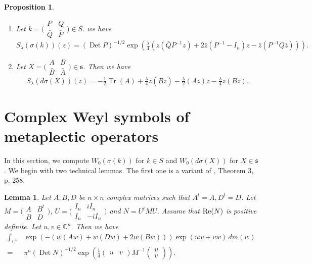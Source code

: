 \documentclass[12pt]{amsart}
\numberwithin{equation}{section}
\newtheorem{lemma}[theorem]{Lemma}
\newtheorem{proposition}[theorem]{Proposition}
\DeclareMathOperator{\Det}{Det} \DeclareMathOperator{\Tr}{Tr}
\begin{document}
\begin{proposition} \label{propSsigma} \begin{enumerate} \item Let $k=\bigl(\begin{smallmatrix} P&Q\\
{\bar Q}&{\bar P} \end{smallmatrix}\bigr)\in S$. we have 
\begin{equation*}S_{\lambda}(\sigma(k))(z)=(\Det P)^{-1/2}\exp \left(\tfrac{\lambda}{4}\left(
z({\bar Q}P^{-1}z)+2{\bar z}(P^{-1}-I_n)z-{\bar z}(P^{-1}Q{\bar z})\right)\right).
\end{equation*}
\item  Let $X=\bigl(\begin{smallmatrix} A&B\\
{\bar B}&{\bar A} \end{smallmatrix}\bigr)\in {\mathfrak s}$. Then we have
\begin{equation*}S_{\lambda}(d\sigma (X))(z)=-\tfrac{1}{2}\Tr(A)+\tfrac{\lambda}{4}z({\bar B}z)
-\tfrac{\lambda}{2}(Az){\bar z}-\tfrac{\lambda}{4}{\bar z}(B{\bar z}).\end{equation*}
\end{enumerate}
\end{proposition}

\section{Complex Weyl symbols of metaplectic operators} \label{sec:7}
In this section, we compute $W_0(\sigma(k))$ for $k\in S$ and $W_0(d\sigma(X))$ for
$X\in {\mathfrak s}$. We begin with two technical lemmas. The first one is a variant of \cite{Fo}, Theorem 3, p. 258.

\begin{lemma} \label{lemgauss} Let $A,B, D$ be $n\times n$ complex matrices such that
$A^t=A, D^t=D$. Let $M=\bigl(\begin{smallmatrix} A&B^t\\
B&D \end{smallmatrix}\bigr)$, $U=\bigl(\begin{smallmatrix} I_n&iI_n\\
I_n&-iI_n \end{smallmatrix}\bigr)$ and $N=U^tMU$. Assume that $\operatorname{Re} (N)$ is positive definite. Let $u,v \in {\mathbb C}^n$. Then we have 
\begin{align*}\int_{{\mathbb C}^n}&\exp\left(-\left( w(Aw)+{\bar w}(D{\bar w})+2{\bar w}(Bw)\right)\right)\exp (uw+v{\bar w})\,dm(w)\\
=&\pi^n(\Det N)^{-1/2}\exp \left( \tfrac{1}{4}\begin{pmatrix}u&v\end{pmatrix}M^{-1}\begin{pmatrix}u\\v\end{pmatrix}\right).
\end{align*}
\end{lemma}
\end{document}
